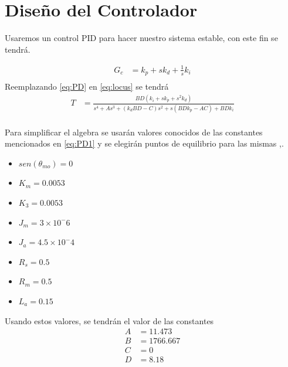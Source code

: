 \documentclass[a4paper]{IEEEtran} %
\begin{document}
\section{Diseño del Controlador}

Usaremos un control PID para hacer nuestro sistema estable, con este fin se tendrá.

\begin{equation}
    \begin{split}
        G_{c}&=k_{p}+sk_{d}+\frac{1}{s}k_{i}\\
    \end{split}
    \label{eq:PD}
\end{equation}
Reemplazando \ref{eq:PD} en \ref{eq:locus} se tendrá
\begin{equation}
    \begin{split}
        T&=\frac{BD(k_{i}+sk_{p}+s^2k_{d})}{s^4+As^3+(k_{d}BD-C)s^2+s(BDk_{p}-AC)+BDk_{i}}\\
    \end{split}
    \label{eq:PD1}
\end{equation}

Para simplificar el algebra se usarán valores conocidos de las constantes mencionados en \ref{eq:PD1} y se elegirán puntos de equilibrio para las mismas \cite{dcmotor},\cite{edxpage}.
\begin{itemize}
    \item $sen(\theta_{mo})=0$
    \item $K_{m}=0.0053$
    \item $K_{3}=0.0053$
    \item $J_{m}=3\times 10^-6$
    \item $J_{a}=4.5\times 10^-4$
    \item $R_{s}=0.5$
    \item $R_{m}=0.5$
    \item $L_{a}=0.15$
\end{itemize}

Usando estos valores, se tendrán el valor de las constantes
\begin{equation}
    \begin{split}
        A&=11.473\\
        B&=1766.667\\
        C&=0\\
        D&=8.18\\
    \end{split}
    \label{eq:considera_numerica}
\end{equation}
\end{document}
